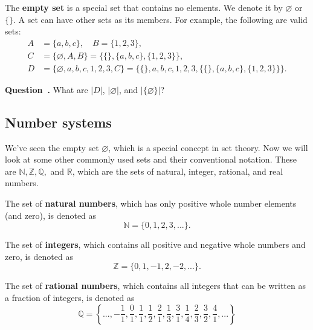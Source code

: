 \documentclass{article}[12pt]
\newcounter{question}
\newenvironment{question}[1][]{\refstepcounter{question}\par\noindent\textbf{Question~\thequestion. #1}\label{q:\thequestion} \rmfamily}{}
\newcommand{\N}{\mathbb{N}}
\newcommand{\Z}{\mathbb{Z}}
\newcommand{\Q}{\mathbb{Q}}
\newcommand{\R}{\mathbb{R}}
\begin{document}
            The \textbf{empty set} is a special set that contains no elements. We denote it by $\varnothing$ or $\{\}$. A set can have other sets as its members. For example, the following are valid sets:
            \begin{align}
                A &= \{a, b, c\}, \quad B = \{1, 2, 3\},
                \\
                C &= \{\varnothing, A, B\} = \{\{\}, \{a, b, c\}, \{1, 2, 3\}\},
                \\
                D &= \{\varnothing, a, b, c, 1, 2, 3, C\}
                = \{\{\}, a, b, c, 1, 2, 3, \{\{\}, \{a, b, c\}, \{1, 2, 3\}\}\}.
            \end{align}
            
            \begin{question}
                What are $|D|$, $|\varnothing|$, and $|\{\varnothing\}|$?
            \end{question}
        
        \subsection{Number systems}
            
            We've seen the empty set $\varnothing$, which is a special concept in set theory. Now we will look at some other commonly used sets and their conventional notation. These are $\N, \Z, \Q,$ and $\R$, which are the sets of natural, integer, rational, and real numbers.
            
            The set of \textbf{natural numbers}, which has only positive whole number elements (and zero), is denoted as
            \begin{equation}
                \N = \{0, 1, 2, 3, ...\}.
            \end{equation}
        
            The set of \textbf{integers}, which contains all positive and negative whole numbers and zero, is denoted as
            \begin{equation}
                \Z = \{0, 1, -1, 2, -2, ...\}.
            \end{equation}
            
            The set of \textbf{rational numbers}, which contains all integers that can be written as a fraction of integers, is denoted as
            \begin{equation}
                \Q
                = \left\{..., -\frac{1}{1} , \frac{0}{1}, \frac{1}{1}, \frac{1}{2}, \frac{2}{1}, \frac{1}{3}, \frac{3}{1}, \frac{1}{4}, \frac{2}{3}, \frac{3}{2}, \frac{4}{1}, ...\right\}
            \end{equation}
            
\end{document}
